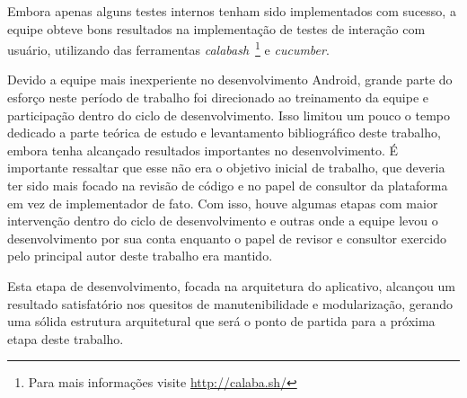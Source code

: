 Embora apenas alguns testes internos tenham sido implementados com sucesso, a equipe obteve bons resultados na implementação de testes de interação com usuário, utilizando das ferramentas \textit{calabash}~\footnote{Para mais informações visite \url{http://calaba.sh/}} e  \textit{cucumber}.

Devido a equipe mais inexperiente no desenvolvimento Android, grande parte do esforço neste período de trabalho foi direcionado ao treinamento da equipe e participação dentro do ciclo de desenvolvimento. Isso limitou um pouco o tempo dedicado a parte teórica  de estudo e levantamento bibliográfico deste trabalho, embora tenha alcançado resultados importantes no desenvolvimento. É importante ressaltar que esse não era o objetivo inicial de trabalho, que deveria ter sido mais focado na revisão de código e no papel de consultor da plataforma em vez de implementador de fato. Com isso, houve algumas etapas com maior intervenção dentro do ciclo de desenvolvimento e outras onde a equipe levou o desenvolvimento por sua conta enquanto o papel de revisor e consultor exercido pelo principal autor deste trabalho era mantido.

Esta etapa de desenvolvimento, focada na arquitetura do aplicativo, alcançou um resultado satisfatório nos quesitos de manutenibilidade e modularização, gerando uma sólida estrutura arquitetural que será o ponto de partida para a próxima etapa deste trabalho.
